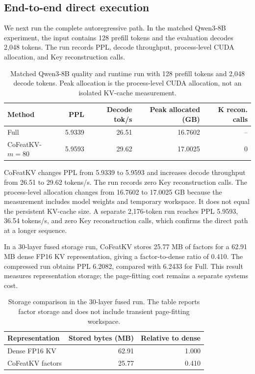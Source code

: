 \documentclass{article} %
\begin{document}
\subsection{End-to-end direct execution}

We next run the complete autoregressive path. In the matched Qwen3-8B
experiment, the input contains 128 prefill tokens and the evaluation decodes
2,048 tokens. The run records PPL, decode throughput, process-level CUDA
allocation, and Key reconstruction calls.

\begin{table}[H]
\centering
\caption{Matched Qwen3-8B quality and runtime run with 128 prefill tokens
and 2,048 decode tokens. Peak allocation is the process-level CUDA
allocation, not an isolated KV-cache measurement.}
\label{tab:end-to-end-matched}
\small
\setlength{\tabcolsep}{4pt}
\begin{tabular}{lrrrr}
\toprule
Method & PPL & Decode tok/s & Peak allocated (GB) & K recon. calls \\
\midrule
Full & 5.9339 & 26.51 & 16.7602 & -- \\
CoFeatKV-$m=80$ & 5.9593 & 29.62 & 17.0025 & 0 \\
\bottomrule
\end{tabular}
\end{table}

CoFeatKV changes PPL from 5.9339 to 5.9593 and increases decode throughput
from 26.51 to 29.62 tokens/s. The run records zero Key reconstruction calls.
The process-level allocation changes from 16.7602 to 17.0025 GB because the
measurement includes model weights and temporary workspace. It does not equal
the persistent KV-cache size. A separate 2,176-token run reaches PPL 5.9593,
36.54 tokens/s, and zero Key reconstruction calls, which confirms the direct
path at a longer sequence.

In a 30-layer fused storage run, CoFeatKV stores 25.77 MB of factors for a
62.91 MB dense FP16 KV representation, giving a factor-to-dense ratio of
0.410. The compressed run obtains PPL 6.2082, compared with 6.2433 for Full.
This result measures representation storage; the page-fitting cost remains a
separate systems cost.

\begin{table}[H]
\centering
\caption{Storage comparison in the 30-layer fused run. The table reports
factor storage and does not include transient page-fitting workspace.}
\label{tab:storage}
\small
\setlength{\tabcolsep}{8pt}
\begin{tabular}{lrr}
\toprule
Representation & Stored bytes (MB) & Relative to dense \\
\midrule
Dense FP16 KV & 62.91 & 1.000 \\
CoFeatKV factors & 25.77 & 0.410 \\
\bottomrule
\end{tabular}
\end{table}
\fi
\end{document}
